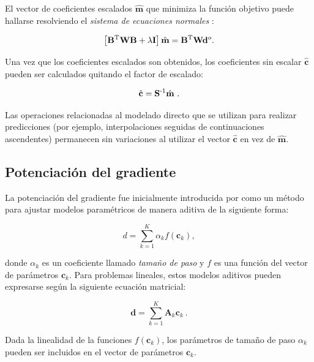 El vector de coeficientes escalados $\hat{\mathbf{m}}$ que minimiza la función
objetivo puede hallarse resolviendo el \emph{sistema de ecuaciones normales}
\citep{menke1989}:

\begin{equation}
    \left[
      \mathbf{B}^{\text{T}} \mathbf{W} \mathbf{B} + \lambda \mathbf{I}
    \right]
    \hat{\mathbf{m}} =
    \mathbf{B}^{\text{T}}\mathbf{W}
    \mathbf{d}^o.
    \label{eq:least_squares_solution}
\end{equation}

Una vez que los coeficientes escalados son obtenidos, los coeficientes sin
escalar
$\hat{\mathbf{c}}$ pueden ser calculados quitando el factor de escalado:

\begin{equation}
    \hat{\mathbf{c}} = \mathbf{S}^{\text{-}1} \hat{\mathbf{m}} \ .
\end{equation}

\noindent Las operaciones relacionadas al modelado directo que se utilizan para
realizar predicciones (por ejemplo, interpolaciones seguidas de continuaciones
ascendentes) permanecen sin variaciones al utilizar el vector
$\hat{\mathbf{c}}$ en vez de $\hat{\mathbf{m}}$.


\subsection{Potenciación del gradiente}

La potenciación del gradiente fue inicialmente introducida por
\citet{friedman2001, friedman2002} como un método para ajustar modelos
paramétricos de manera aditiva de la siguiente forma:

\begin{equation}
    d = \sum_{k=1}^K \alpha_k f(\mathbf{c}_k),
\end{equation}

\noindent donde $\alpha_k$ es un coeficiente llamado \emph{tamaño de paso}
y $f$ es una función del vector de parámetros $\mathbf{c}_k$.
Para problemas lineales, estos modelos aditivos pueden expresarse según la
siguiente ecuación matricial:

\begin{equation}
    \mathbf{d} = \sum_{k=1}^K \mathbf{A}_k \mathbf{c}_k \ .
    \label{eq:gb-linear-model}
\end{equation}

\noindent Dada la linealidad de la funciones $f(\mathbf{c}_k)$, los parámetros
de tamaño de paso $\alpha_k$ pueden ser incluidos en el vector de parámetros
$\mathbf{c}_k$.

